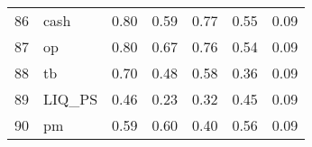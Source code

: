 \documentclass[12pt]{article}
\begin{document}
\begin{footnotesize}
\begin{longtable}{rl|c|c|c|c|c}
				86                   & cash                        & 0.80                             & 0.59                                                                                          & 0.77                                                                                          & 0.55                                                                                          & 0.09                                                                                                   \\
				87                   & op                          & 0.80                             & 0.67                                                                                          & 0.76                                                                                          & 0.54                                                                                          & 0.09                                                                                                   \\
				88                   & tb                          & 0.70                             & 0.48                                                                                          & 0.58                                                                                          & 0.36                                                                                          & 0.09                                                                                                   \\
				89                   & LIQ\_PS                     & 0.46                             & 0.23                                                                                          & 0.32                                                                                          & 0.45                                                                                          & 0.09                                                                                                   \\
				90                   & pm                          & 0.59                             & 0.60                                                                                          & 0.40                                                                                          & 0.56                                                                                          & 0.09                                                                                                   \\

\end{longtable}
\end{footnotesize}
\end{document}
